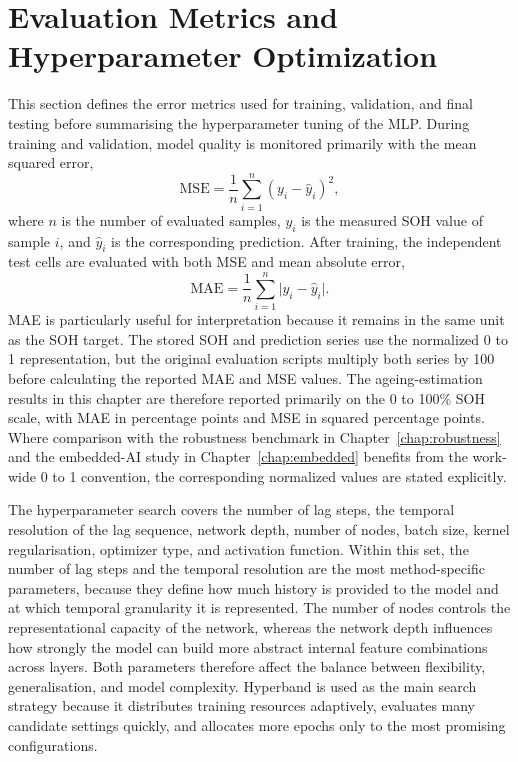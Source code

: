 \documentclass[
    a4paper,
    12pt,
    titlepage,
    bibliography=totoc,
    twoside=on,
    parskip=false,
    numbers=noenddot,
    cleardoublepage=empty,
    DIV=12,
    BCOR=12.0mm,
    headheight=36pt,
    headings=openright
]{scrreprt}
\begin{document}
\section{Evaluation Metrics and Hyperparameter Optimization}
This section defines the error metrics used for training, validation, and final testing before summarising the hyperparameter tuning of the MLP. During training and validation, model quality is monitored primarily with the mean squared error,
\begin{equation}
\mathrm{MSE} = \frac{1}{n} \sum_{i=1}^{n}(y_i - \hat{y}_i)^2 ,
\end{equation}
where $n$ is the number of evaluated samples, $y_i$ is the measured SOH value of sample $i$, and $\hat{y}_i$ is the corresponding prediction. After training, the independent test cells are evaluated with both MSE and mean absolute error,
\begin{equation}
\mathrm{MAE} = \frac{1}{n} \sum_{i=1}^{n} \lvert y_i - \hat{y}_i \rvert .
\end{equation}
MAE is particularly useful for interpretation because it remains in the same unit as the SOH target. The stored SOH and prediction series use the normalized 0 to 1 representation, but the original evaluation scripts multiply both series by 100 before calculating the reported MAE and MSE values. The ageing-estimation results in this chapter are therefore reported primarily on the 0 to 100\% SOH scale, with MAE in percentage points and MSE in squared percentage points. Where comparison with the robustness benchmark in Chapter~\ref{chap:robustness} and the embedded-AI study in Chapter~\ref{chap:embedded} benefits from the work-wide 0 to 1 convention, the corresponding normalized values are stated explicitly.

The hyperparameter search covers the number of lag steps, the temporal resolution of the lag sequence, network depth, number of nodes, batch size, kernel regularisation, optimizer type, and activation function. Within this set, the number of lag steps and the temporal resolution are the most method-specific parameters, because they define how much history is provided to the model and at which temporal granularity it is represented. The number of nodes controls the representational capacity of the network, whereas the network depth influences how strongly the model can build more abstract internal feature combinations across layers. Both parameters therefore affect the balance between flexibility, generalisation, and model complexity. Hyperband is used as the main search strategy because it distributes training resources adaptively, evaluates many candidate settings quickly, and allocates more epochs only to the most promising configurations.\autocite{liHyperbandNovelBanditBased2016}
\end{document}

